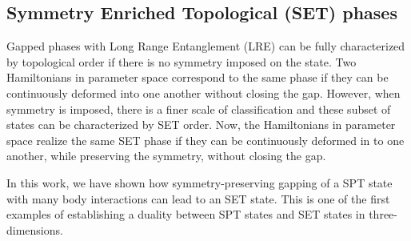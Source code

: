\subsection{Symmetry Enriched Topological (SET) phases}
Gapped phases with Long Range Entanglement (LRE) can be fully characterized by topological order if there is no symmetry imposed on the state. Two Hamiltonians in parameter space correspond to the same phase if they can be continuously deformed into one another without closing the gap. However, when symmetry is imposed, there is a finer scale of classification and these subset of states can be characterized by SET order. Now, the Hamiltonians in parameter space realize the same SET phase if they can be continuously deformed in to one another, while preserving the symmetry, without closing the gap.

In this work, we have shown how symmetry-preserving gapping of a SPT state with many body interactions can lead to an SET state. This is one of the first examples of establishing a duality between SPT states and SET states in three-dimensions.






